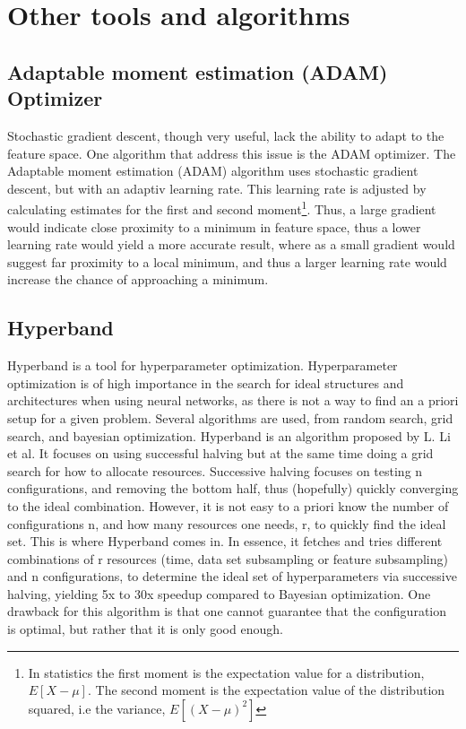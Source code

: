 \section{Other tools and algorithms}
\subsection*{Adaptable moment estimation (ADAM) Optimizer}
Stochastic gradient descent, though very useful, lack the ability to adapt to the feature space. One algorithm that address this
issue is the ADAM optimizer\cite{ADAM:opti}. The Adaptable moment estimation (ADAM) algorithm uses stochastic gradient descent, but with 
an adaptiv learning rate. This learning rate is adjusted by calculating estimates for the first and second moment\footnote{In statistics
the first moment is the expectation value for a distribution, $E[X-\mu]$. The second moment is the 
expectation value of the distribution squared, i.e the variance, $E[(X-\mu)^2]$}. Thus, a large gradient would indicate close proximity 
to a minimum in feature space, thus a lower learning rate would yield a more accurate result, 
where as a small gradient would suggest far proximity to a local minimum, and thus a larger learning rate would increase the chance 
of approaching a minimum.\par 

\subsection*{Hyperband}
Hyperband is a tool for hyperparameter optimization\cite{hyperband:opt}. Hyperparameter optimization is of high importance in the 
search for ideal structures and architectures when using neural networks, as there is not a way to find an a priori setup for a 
given problem. Several algorithms are used, from random search, grid search, and bayesian optimization. Hyperband is an algorithm 
proposed by L. Li et al. It focuses on using successful halving\cite{successivehalving}
but at the same time doing a grid search for how to allocate resources. Successive halving focuses on testing n configurations, and removing 
the bottom half, thus (hopefully) quickly converging to the ideal combination. However, it is not easy to a priori know the 
number of configurations n, and how many resources one needs, r, to quickly find the ideal set. This is where Hyperband comes in. 
In essence, it fetches and tries different combinations of r resources (time, data set subsampling or feature subsampling) and n 
configurations, to determine the ideal set of hyperparameters via successive halving, yielding 5x to 30x speedup compared to 
Bayesian optimization. One drawback for this algorithm is that one cannot guarantee that the configuration is optimal, 
but rather that it is only good enough. 

